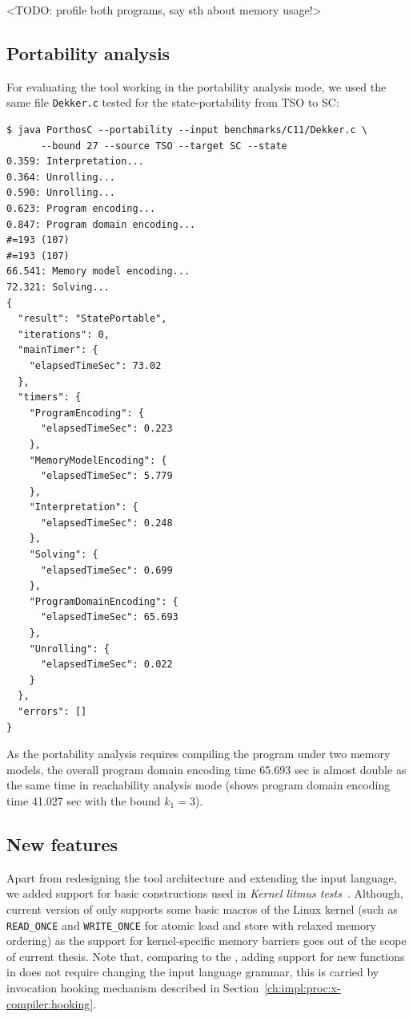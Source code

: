 
<TODO: profile both programs, say sth about memory usage!> 


\subsection{Portability analysis}
\label{ch:eval:perf:port}

For evaluating the tool working in the portability analysis mode, we used the same file \texttt{Dekker.c} tested for the state-portability from TSO to SC: %


\begin{lstlisting}
$ java PorthosC --portability --input benchmarks/C11/Dekker.c \
      --bound 27 --source TSO --target SC --state
0.359: Interpretation...
0.364: Unrolling...
0.590: Unrolling...
0.623: Program encoding...
0.847: Program domain encoding...
#=193 (107)
#=193 (107)
66.541: Memory model encoding...
72.321: Solving...
{
  "result": "StatePortable",
  "iterations": 0,
  "mainTimer": {
    "elapsedTimeSec": 73.02
  },
  "timers": {
    "ProgramEncoding": {
      "elapsedTimeSec": 0.223
    },
    "MemoryModelEncoding": {
      "elapsedTimeSec": 5.779
    },
    "Interpretation": {
      "elapsedTimeSec": 0.248
    },
    "Solving": {
      "elapsedTimeSec": 0.699
    },
    "ProgramDomainEncoding": {
      "elapsedTimeSec": 65.693
    },
    "Unrolling": {
      "elapsedTimeSec": 0.022
    }
  },
  "errors": []
}
\end{lstlisting}

As the portability analysis requires compiling the program under two memory models, the overall program domain encoding time 65.693 sec is almost double as the same time in reachability analysis mode (\porthos[1] shows program domain encoding time 41.027 sec with the bound $k_1=3$).


\subsection{New features}
\label{ch:eval:perf:feat}

Apart from redesigning the tool architecture and extending the input language, we added support for basic constructions used in \textit{Kernel litmus tests}~\cite{alglave2018frightening}.
Although, current version of \porthos[2] only supports some basic macros of the Linux kernel (such as \texttt{READ\_ONCE} and \texttt{WRITE\_ONCE} for atomic load and store with relaxed memory ordering) as the support for kernel-specific memory barriers goes out of the scope of current thesis.
Note that, comparing to the \porthos[1], adding support for new functions in \porthos[2] does not require changing the input language grammar, this is carried by invocation hooking mechanism described in Section~\ref{ch:impl:proc:x-compiler:hooking}.

